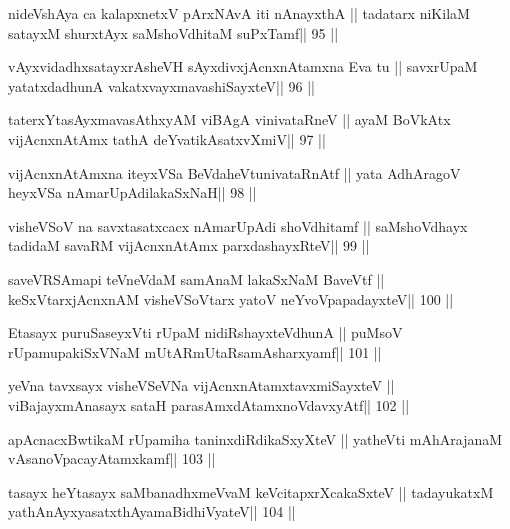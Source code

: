 \begin{shl}
nideVshAya ca kalapxnetxV pArxNAvA iti  nAnayxthA ||
tadatarx niKilaM satayxM shurxtAyx saMshoVdhitaM suPxTamf\hfill || 95 ||
\end{shl}

\begin{shl}
vAyxvidadhxsatayxrAsheVH sAyxdivxjAcnxnAtamxna Eva tu ||
savxrUpaM yatatxdadhunA vakatxvayxmavashiSayxteV\hfill || 96 ||
\end{shl}

\begin{shl}
taterxYtasAyxmavasAthxyAM viBAgA vinivataRneV ||
ayaM BoVkAtx vijAcnxnAtAmx tathA deYvatikAsatxvXmiV\hfill || 97 ||
\end{shl}

\begin{shl}
vijAcnxnAtAmxna iteyxVSa BeVdaheVtunivataRnAtf ||
yata AdhAragoV heyxVSa nAmarUpAdilakaSxNaH\hfill || 98 ||
\end{shl}

\begin{shl}
visheVSoV na savxtasatxcacx nAmarUpAdi shoVdhitamf ||
saMshoVdhayx tadidaM savaRM vijAcnxnAtAmx parxdashayxRteV\hfill || 99 ||
\end{shl}

\begin{shl}
saveVRSAmapi teVneVdaM samAnaM lakaSxNaM BaveVtf ||
keSxVtarxjAcnxnAM visheVSoV\s tarx yatoV neYvoVpapadayxteV\hfill || 100 ||
\end{shl}

\begin{shl}
Etasayx puruSaseyxVti rUpaM nidiRshayxteV\s dhunA ||
puMsoV rUpamupakiSxVNaM mUtARmUtaRsamAsharxyamf\hfill || 101 ||
\end{shl}

\begin{shl}
yeVna tavxsayx visheVSeVNa vijAcnxnAtamxtavxmiSayxteV ||
viBajayxmAnasayx sataH parasAmxdAtamxnoV\s davxyAtf\hfill || 102 ||
\end{shl}

\begin{shl}
apAcnacxBwtikaM rUpamiha taninxdiRdikaSxyXteV ||
yatheVti mAhArajanaM vAsanoVpacayAtamxkamf\hfill || 103 ||
\end{shl}

\begin{shl}
tasayx heYtasayx saMbanadhxmeVvaM keVcitapxrXcakaSxteV ||
tadayukatxM yathA\s nAyxyasatxthA\s yamaBidhiVyateV\hfill || 104 ||
\end{shl}

